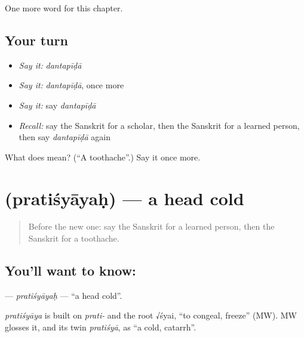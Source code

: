 \begin{grammarlens}[title={What you've built}]
One more word for this chapter.
\end{grammarlens}

\subsection*{Your turn}
\begin{itemize}
\raggedright
  \item \emph{Say it:} \emph{dantapīḍā}
  \item \emph{Say it:} \emph{dantapīḍā}, once more
  \item \emph{Say it:} say \emph{dantapīḍā}
  \item \emph{Recall:} say the Sanskrit for a scholar, then the Sanskrit for a learned person, then say \emph{dantapīḍā} again
\end{itemize}

\begin{tcolorbox}[breakable,colback=teal!4,colframe=teal!35!black,title={Before you move on}]
What does  mean? (\textquotedblleft{}A toothache\textquotedblright{}.) Say it once more.
\end{tcolorbox}
\section[\texorpdfstring{\sk{प्रतिश्यायः} (pratiśyāyaḥ)}{प्रतिश्यायः (pratiśyāyaḥ)}]{ (pratiśyāyaḥ) — a head cold}

\label{lesson:SA-C181-pratisyayah}



\begin{quote}
Before the new one: say the Sanskrit for a learned person, then the Sanskrit for a toothache.
\end{quote}

\subsection*{You'll want to know: }
\textbf{} — \emph{pratiśyāyaḥ} — \textquotedblleft{}a head cold\textquotedblright{}.

\begin{cousinweb}
\emph{pratiśyāya} is built on \emph{prati-} and the root √śyai, \textquotedblleft{}to congeal, freeze\textquotedblright{} (MW). MW glosses it, and its twin \emph{pratiśyā}, as \textquotedblleft{}a cold, catarrh\textquotedblright{}.
\end{cousinweb}

